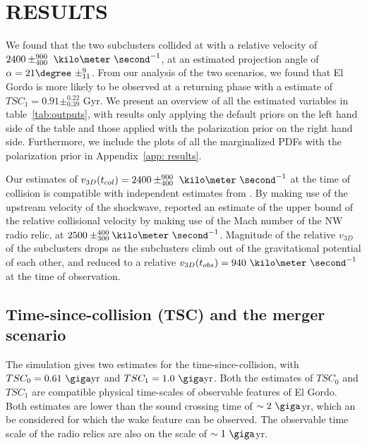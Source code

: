%


\section{RESULTS} 
We found that the two subclusters collided at with a relative velocity of 
$2400\pm^{900}_{400}~\kilo\meter~\second^{-1}$, at an estimated projection
angle of $\alpha = 21\degree~\pm^{9}_{11}$. From our analysis of the two
scenarios, we found that El Gordo is more likely to be observed at a returning
phase with a estimate of $TSC_1 = 0.91\pm^{0.22}_{0.39}$ Gyr. We present an
overview of all the estimated variables in table~\ref{tab:outputs}, with
results only applying the default priors on the left hand side of the table
and those applied with the polarization prior on the right hand side.
Furthermore, we include the plots of all the marginalized PDFs with the
polarization prior in Appendix~\ref{app: results}. \par 
Our estimates of $v_{3D}(t_{col}) = 2400\pm^{900}_{400}~\kilo\meter~\second^{-1}$ at the time of collision is compatible with independent estimates from \citealt{L13}. 
By making use of the upstream velocity of the shockwave, \cite{L13}
reported an estimate of the upper bound of the relative collisional
velocity by making use of the Mach number of the NW radio relic, at $2500
\pm^{400}_{300}\kilo\meter~\second^{-1}$. Magnitude of the
relative $v_{3D}$ of the subclusters drops as the subclusters climb out of the gravitational potential of each
other, and reduced to a relative $v_{3D}(t_{obs}) = 940~\kilo\meter~\second^{-1}$ at
the time of observation. 



\subsection{Time-since-collision (TSC) and the merger scenario}
The simulation gives two estimates for
the time-since-collision, with $TSC_0 = 0.61~\giga \text{yr}$ and $TSC_1 =
1.0~\giga\text{yr}$. Both the estimates of $TSC_0$ and $TSC_1$ are
compatible physical time-scales of observable features of El Gordo.  
Both estimates are lower than the sound crossing time of $\sim2~\giga$yr,
which an be considered for which the wake feature can be observed. 
The observable time scale of the radio relics are also on the scale of
$\sim1~\giga$yr. 

